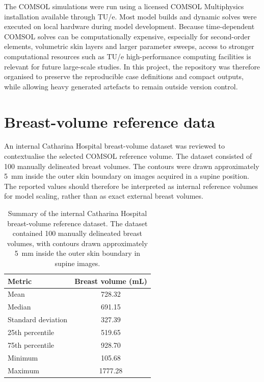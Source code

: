 The COMSOL simulations were run using a licensed COMSOL Multiphysics installation available through TU/e. Most model builds and dynamic solves were executed on local hardware during model development. Because time-dependent COMSOL solves can be computationally expensive, especially for second-order elements, volumetric skin layers and larger parameter sweeps, access to stronger computational resources such as TU/e high-performance computing facilities is relevant for future large-scale studies. In this project, the repository was therefore organised to preserve the reproducible case definitions and compact outputs, while allowing heavy generated artefacts to remain outside version control.

\newpage
\section{Breast-volume reference data}
\label{sec:appendix_breast_volume_reference}

An internal Catharina Hospital breast-volume dataset was reviewed to contextualise the selected COMSOL reference volume. The dataset consisted of 100 manually delineated breast volumes. The contours were drawn approximately 5~mm inside the outer skin boundary on images acquired in a supine position. The reported values should therefore be interpreted as internal reference volumes for model scaling, rather than as exact external breast volumes.

\begin{table}[H]
\centering
\caption{Summary of the internal Catharina Hospital breast-volume reference dataset. The dataset contained 100 manually delineated breast volumes, with contours drawn approximately 5~mm inside the outer skin boundary in supine images.}
\label{tab:appendix_breast_volume_reference}
\begin{tabular}{lc}
\toprule
Metric & Breast volume (mL) \\
\midrule
Mean & 728.32 \\
Median & 691.15 \\
Standard deviation & 327.39 \\
25th percentile & 519.65 \\
75th percentile & 928.70 \\
Minimum & 105.68 \\
Maximum & 1777.28 \\
\bottomrule
\end{tabular}
\end{table}

